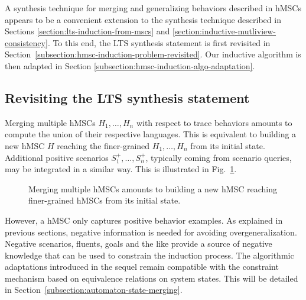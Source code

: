 A synthesis technique for merging and generalizing behaviors described in hMSCs appears to be a convenient extension to the synthesis technique described in Sections \ref{section:lts-induction-from-mscs} and \ref{section:inductive-mutliview-consistency}. To this end, the LTS synthesis statement is first revisited in Section~\ref{subsection:hmsc-induction-problem-revisited}. Our inductive algorithm is then adapted in Section \ref{subsection:hmsc-induction-algo-adaptation}.

\subsection{Revisiting the LTS synthesis statement\label{subsection:hmsc-induction-problem-revisited}}

Merging multiple hMSCs $H_1,\ldots,H_n$ with respect to trace behaviors amounts to compute the union of their respective languages. This is equivalent to building a new hMSC $H$ reaching the finer-grained $H_1,\ldots,H_n$ from its initial state. Additional positive scenarios $S^+_1,\ldots,S^+_n$, typically coming from scenario queries, may be integrated in a similar way. This is illustrated in Fig.~\ref{figure:multiple-hmscs}.

\begin{figure}\centering
{}
\caption{Merging multiple hMSCs amounts to building a new hMSC reaching finer-grained hMSCs from its initial state.\label{figure:multiple-hmscs}} 
\end{figure}

However, a hMSC only captures positive behavior examples. As explained in previous sections, negative information is needed for avoiding overgeneralization. Negative scenarios, fluents, goals and the like provide a source of negative knowledge that can be used to constrain the induction process. The algorithmic adaptations introduced in the sequel remain compatible with the constraint mechanism based on equivalence relations on system states. This will be detailed in Section~\ref{subsection:automaton-state-merging}.

